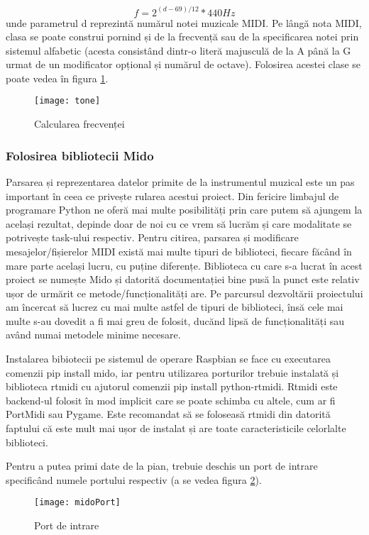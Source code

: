 \documentclass[../IoMusT.tex]{subfiles}
\begin{document}
\[ f = 2^{(d-69)/12} * 440Hz\]
unde parametrul d reprezintă numărul notei muzicale MIDI. Pe lângă nota MIDI, clasa se poate construi pornind și de la frecvență sau de la specificarea notei prin sistemul alfabetic (acesta consistând dintr-o literă majusculă de la A până la G urmat de un modificator opțional și numărul de octave). Folosirea acestei clase se poate vedea în figura \ref{fig:tone}.
\begin{figure}[h]
\centering
\texttt{[image: tone]}
\caption{Calcularea frecvenței}
\label{fig:tone}
\end{figure}

\subsubsection{Folosirea bibliotecii Mido}
Parsarea și reprezentarea datelor primite de la instrumentul muzical este un pas important în ceea ce privește rularea acestui proiect. Din fericire limbajul de programare Python ne oferă mai multe posibilități prin care putem să ajungem la același rezultat, depinde doar de noi cu ce vrem să lucrăm și care modalitate se potrivește task-ului respectiv. Pentru citirea, parsarea și modificare mesajelor/fișierelor MIDI există mai multe tipuri de biblioteci, fiecare făcând în mare parte același lucru, cu puține diferențe. Biblioteca cu care s-a lucrat în acest proiect se numește Mido și datorită documentației bine pusă la punct este relativ ușor de urmărit ce metode/funcționalități are. Pe parcursul dezvoltării proiectului am încercat să lucrez cu mai multe astfel de tipuri de biblioteci, însă cele mai multe s-au dovedit a fi mai greu de folosit, ducănd lipsă de funcționalități sau având numai metodele minime necesare.
\\
\par Instalarea bibiotecii pe sistemul de operare Raspbian se face cu executarea comenzii pip install mido, iar pentru utilizarea porturilor trebuie instalată și biblioteca rtmidi cu ajutorul comenzii pip install python-rtmidi. Rtmidi este backend-ul folosit în mod implicit care se poate schimba cu altele, cum ar fi PortMidi sau Pygame. Este recomandat să se foloseasă rtmidi din datorită faptului că este mult mai ușor de instalat și are toate caracteristicile celorlalte biblioteci. 
\\
\par Pentru a putea primi date de la pian, trebuie deschis un port de intrare specificând numele portului respectiv (a se vedea figura \ref{fig:port}).
\begin{figure}[h]
\centering
\texttt{[image: midoPort]}
\caption{Port de intrare}
\label{fig:port}
\end{figure}
\end{document}
